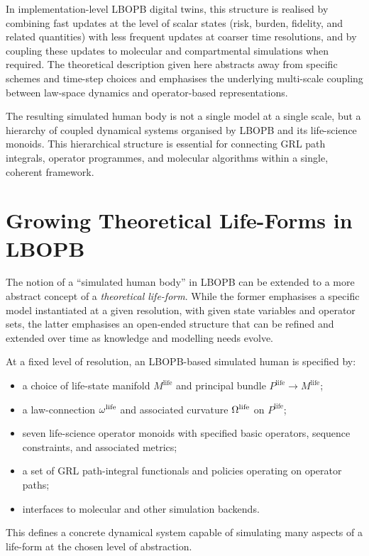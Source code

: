 \documentclass[11pt]{book}
\theoremstyle{plain}
\theoremstyle{definition}
\theoremstyle{remark}
\begin{document}
In implementation-level LBOPB digital twins, this structure is realised
by combining fast updates at the level of scalar states (risk, burden,
fidelity, and related quantities) with less frequent updates at
coarser time resolutions, and by coupling these updates to molecular
and compartmental simulations when required. The theoretical
description given here abstracts away from specific schemes and
time-step choices and emphasises the underlying multi-scale coupling
between law-space dynamics and operator-based representations.

The resulting simulated human body is not a single model at a single
scale, but a hierarchy of coupled dynamical systems organised by LBOPB
and its life-science monoids. This hierarchical structure is essential
for connecting GRL path integrals, operator programmes, and molecular
algorithms within a single, coherent framework.

\section{Growing Theoretical Life-Forms in LBOPB}


The notion of a ``simulated human body'' in LBOPB can be extended to a
more abstract concept of a \emph{theoretical life-form}. While the
former emphasises a specific model instantiated at a given resolution,
with given state variables and operator sets, the latter emphasises an
open-ended structure that can be refined and extended over time as
knowledge and modelling needs evolve.

At a fixed level of resolution, an LBOPB-based simulated human is
specified by:
\begin{itemize}
  \item a choice of life-state manifold $M^{\mathrm{life}}$ and
        principal bundle $P^{\mathrm{life}} \to M^{\mathrm{life}}$;
  \item a law-connection $\omega^{\mathrm{life}}$ and associated
        curvature $\Omega^{\mathrm{life}}$ on $P^{\mathrm{life}}$;
  \item seven life-science operator monoids with specified basic
        operators, sequence constraints, and associated metrics;
  \item a set of GRL path-integral functionals and policies operating
        on operator paths;
  \item interfaces to molecular and other simulation backends.
\end{itemize}
This defines a concrete dynamical system capable of simulating many
aspects of a life-form at the chosen level of abstraction.
\end{document}
